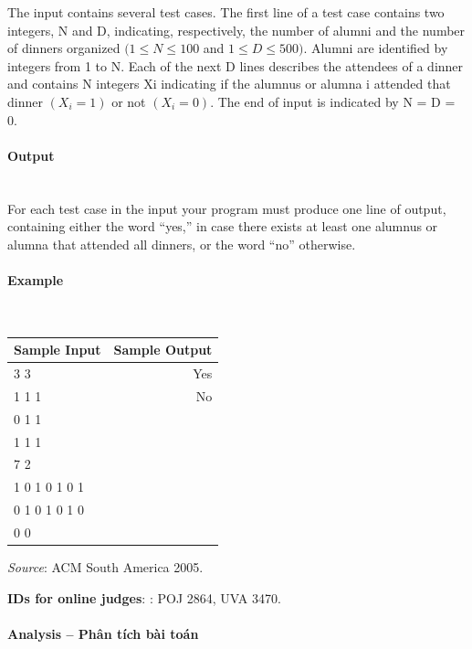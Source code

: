 \documentclass{article}
\begin{document}
The input contains several test cases. The first line of a test case contains two integers, N and D,
indicating, respectively, the number of alumni and the number of dinners organized $(1 \leq N \leq
100$ and $1 \leq D \leq 500)$. Alumni are identified by integers from 1 to N. Each of the next D lines
describes the attendees of a dinner and contains N integers Xi
 indicating if the alumnus or alumna
i attended that dinner $(X_i = 1)$ or not $(X_i = 0)$. The end of input is indicated by N = D = 0.

\paragraph{Output}\mbox{} \\
For each test case in the input your program must produce one line of output, containing either
the word “yes,” in case there exists at least one alumnus or alumna that attended all dinners, or
the word “no” otherwise.


\paragraph{Example}\mbox{} \\

\begin{table}[h]
    \centering
    \begin{tabular}{|l|r|}
        \hline
        \textbf{Sample Input} & \textbf{Sample Output} \\
        \hline
        3 3    & Yes  \\ 
        1 1 1    & No \\ 
        0 1 1    &  \\ 
        1 1 1    &  \\ 
        7 2    &  \\ 
        1 0 1 0 1 0 1    &  \\ 
		0 1 0 1 0 1 0&   \\
		0 0 &  \\ 
		\hline
    \end{tabular}
\end{table}

\textit{Source}: ACM South America 2005.

\textbf{IDs for online judges}: : POJ 2864, UVA 3470.


\paragraph{Analysis -- Phân tích bài toán} \mbox{} \\
\end{document}
